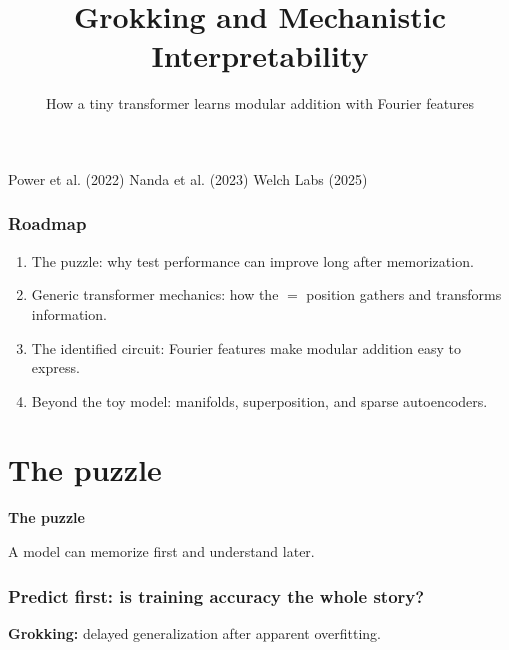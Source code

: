 \documentclass[aspectratio=169]{beamer}
\title{Grokking and Mechanistic Interpretability}
\subtitle{How a tiny transformer learns modular addition with Fourier features}
\author{}
\date{}
\newcommand{\transition}[2]{\begin{frame}[plain]\vfill\begin{center}\color{popblue}\bfseries\fontsize{30}{34}\selectfont #1\par\vspace{0.7cm}\color{black}\Large #2\end{center}\vfill\end{frame}}
\begin{document}
\begin{frame}
  \titlepage
  \vfill
  \small Power et al. (2022) \quad Nanda et al. (2023) \quad Welch Labs (2025)
\end{frame}

\begin{frame}
\frametitle{Roadmap}
\begin{enumerate}\setlength\itemsep{0.65em}
  \item The puzzle: why test performance can improve long after memorization.
  \item Generic transformer mechanics: how the $=$ position gathers and transforms information.
  \item The identified circuit: Fourier features make modular addition easy to express.
  \item Beyond the toy model: manifolds, superposition, and sparse autoencoders.
\end{enumerate}
\vfill
\begin{center}\end{center}
\end{frame}

\section{The puzzle}
\transition{The puzzle}{A model can memorize first and understand later.}

\begin{frame}
\frametitle{Predict first: is training accuracy the whole story?}
\begin{center}
\end{center}
\vspace{0.7cm}
\begin{center}\Large\color{popblue}\textbf{Grokking:} delayed generalization after apparent overfitting.\end{center}
\end{frame}
\end{document}
